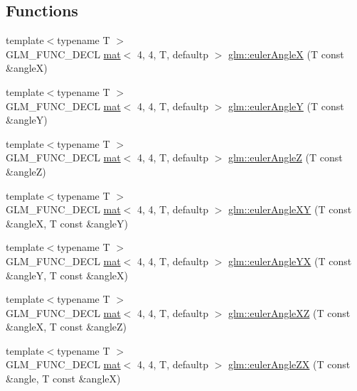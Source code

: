 \subsection*{Functions}
\begin{DoxyCompactItemize}
\item 
{\footnotesize template$<$typename T $>$ }\\G\+L\+M\+\_\+\+F\+U\+N\+C\+\_\+\+D\+E\+CL \hyperlink{structglm_1_1mat}{mat}$<$ 4, 4, T, defaultp $>$ \hyperlink{group__gtx__euler__angles_gafba6282e4ed3ff8b5c75331abfba3489}{glm\+::euler\+AngleX} (T const \&angleX)
\item 
{\footnotesize template$<$typename T $>$ }\\G\+L\+M\+\_\+\+F\+U\+N\+C\+\_\+\+D\+E\+CL \hyperlink{structglm_1_1mat}{mat}$<$ 4, 4, T, defaultp $>$ \hyperlink{group__gtx__euler__angles_gab84bf4746805fd69b8ecbb230e3974c5}{glm\+::euler\+AngleY} (T const \&angleY)
\item 
{\footnotesize template$<$typename T $>$ }\\G\+L\+M\+\_\+\+F\+U\+N\+C\+\_\+\+D\+E\+CL \hyperlink{structglm_1_1mat}{mat}$<$ 4, 4, T, defaultp $>$ \hyperlink{group__gtx__euler__angles_ga5b3935248bb6c3ec6b0d9297d406e251}{glm\+::euler\+AngleZ} (T const \&angleZ)
\item 
{\footnotesize template$<$typename T $>$ }\\G\+L\+M\+\_\+\+F\+U\+N\+C\+\_\+\+D\+E\+CL \hyperlink{structglm_1_1mat}{mat}$<$ 4, 4, T, defaultp $>$ \hyperlink{group__gtx__euler__angles_ga64036577ee17a2d24be0dbc05881d4e2}{glm\+::euler\+Angle\+XY} (T const \&angleX, T const \&angleY)
\item 
{\footnotesize template$<$typename T $>$ }\\G\+L\+M\+\_\+\+F\+U\+N\+C\+\_\+\+D\+E\+CL \hyperlink{structglm_1_1mat}{mat}$<$ 4, 4, T, defaultp $>$ \hyperlink{group__gtx__euler__angles_ga4f57e6dd25c3cffbbd4daa6ef3f4486d}{glm\+::euler\+Angle\+YX} (T const \&angleY, T const \&angleX)
\item 
{\footnotesize template$<$typename T $>$ }\\G\+L\+M\+\_\+\+F\+U\+N\+C\+\_\+\+D\+E\+CL \hyperlink{structglm_1_1mat}{mat}$<$ 4, 4, T, defaultp $>$ \hyperlink{group__gtx__euler__angles_gaa39bd323c65c2fc0a1508be33a237ce9}{glm\+::euler\+Angle\+XZ} (T const \&angleX, T const \&angleZ)
\item 
{\footnotesize template$<$typename T $>$ }\\G\+L\+M\+\_\+\+F\+U\+N\+C\+\_\+\+D\+E\+CL \hyperlink{structglm_1_1mat}{mat}$<$ 4, 4, T, defaultp $>$ \hyperlink{group__gtx__euler__angles_ga483903115cd4059228961046a28d69b5}{glm\+::euler\+Angle\+ZX} (T const \&angle, T const \&angleX)

\end{DoxyCompactItemize}
